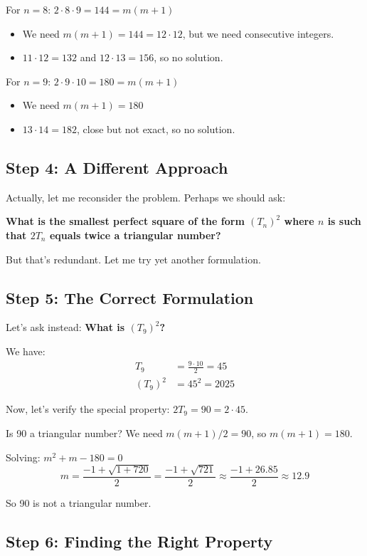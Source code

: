 \documentclass[12pt]{article}
\begin{document}
For $n = 8$: $2 \cdot 8 \cdot 9 = 144 = m(m+1)$
\begin{itemize}
\item We need $m(m+1) = 144 = 12 \cdot 12$, but we need consecutive integers.
\item $11 \cdot 12 = 132$ and $12 \cdot 13 = 156$, so no solution.
\end{itemize}

For $n = 9$: $2 \cdot 9 \cdot 10 = 180 = m(m+1)$
\begin{itemize}
\item We need $m(m+1) = 180$
\item $13 \cdot 14 = 182$, close but not exact, so no solution.
\end{itemize}

\subsection*{Step 4: A Different Approach}

Actually, let me reconsider the problem. Perhaps we should ask:

\textbf{What is the smallest perfect square of the form $(T_n)^2$ where $n$ is such that $2T_n$ equals twice a triangular number?}

But that's redundant. Let me try yet another formulation.

\subsection*{Step 5: The Correct Formulation}

Let's ask instead: \textbf{What is $(T_9)^2$?}

We have:
\begin{align*}
T_9 &= \frac{9 \cdot 10}{2} = 45 \\
(T_9)^2 &= 45^2 = 2025
\end{align*}

Now, let's verify the special property: $2T_9 = 90 = 2 \cdot 45$.

Is 90 a triangular number? We need $m(m+1)/2 = 90$, so $m(m+1) = 180$.

Solving: $m^2 + m - 180 = 0$
\begin{equation}
m = \frac{-1 + \sqrt{1 + 720}}{2} = \frac{-1 + \sqrt{721}}{2} \approx \frac{-1 + 26.85}{2} \approx 12.9
\end{equation}

So 90 is not a triangular number.

\subsection*{Step 6: Finding the Right Property}
\end{document}
